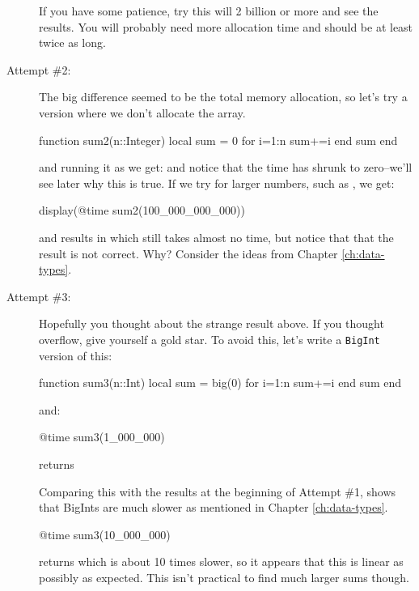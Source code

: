 \begin{description}
If you have some patience, try this will 2 billion or more and see the results.  You will probably need more allocation time and should be at least twice as long.  

\item[Attempt \#2:] The big difference seemed to be the total memory allocation, so let's
try a version where we don't allocate the array.

\begin{jlblock}[fastcode]
function sum2(n::Integer)
    local sum = 0
    for i=1:n
        sum+=i
    end
    sum
end
\end{jlblock}

and running it as  we get:
%
 \printpythontex[verbatim]
%
and notice that the time has shrunk to zero--we'll see later why this is true. If we try for larger numbers, such as , we get:
%
\begin{jlcode}[fastcode]
display(@time sum2(100_000_000_000))
\end{jlcode}
and results in \printpythontex[verbatim]
which still takes almost no time, but notice that that the result is not correct.  Why?  Consider the ideas from Chapter \ref{ch:data-types}.  


\item[Attempt \#3:]

Hopefully you thought about the strange result above.  If you thought overflow, give yourself a gold star.  To avoid this, let's write a \texttt{BigInt} version of this:
%
\begin{jlblock}[fastcode]
function sum3(n::Int)
    local sum = big(0)
    for i=1:n
        sum+=i
    end
    sum
end
\end{jlblock}
%
and:
%
\begin{jlblock}[fastcode]
@time sum3(1_000_000)
\end{jlblock}
%
returns  \printpythontex[verbatim]

Comparing this with the results at the beginning of Attempt \#1, shows that BigInts are much slower as mentioned in Chapter \ref{ch:data-types}.  

\begin{jlblock}[fastcode]
@time sum3(10_000_000)
\end{jlblock}
%
returns  \printpythontex[verbatim]
%
which is about 10 times slower, so it appears that this is linear as possibly as expected. This isn't practical to find much larger sums though. 


\end{description}
